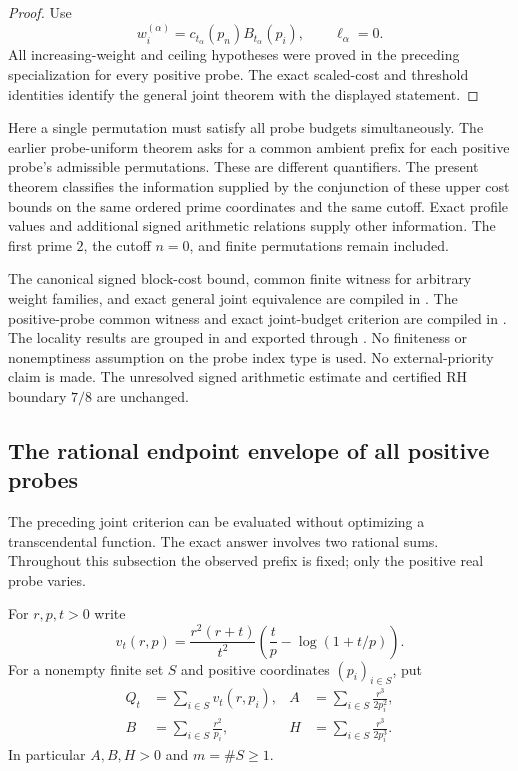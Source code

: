 \documentclass[11pt]{article}
\theoremstyle{definition}
\begin{document}
\begin{proof}
Use
\[
 w_i^{(\alpha)}
    =c_{t_\alpha}(p_n)B_{t_\alpha}(p_i),
       \qquad \ell_\alpha=0.
\]
All increasing-weight and ceiling hypotheses were proved in the
preceding specialization for every positive probe. The exact
scaled-cost and threshold identities identify the general
joint theorem with the displayed statement.
\end{proof}

Here a single permutation must satisfy all probe budgets
simultaneously. The earlier probe-uniform theorem asks for a
common ambient prefix for each positive probe's admissible
permutations. These are different quantifiers.
The present theorem classifies the information supplied by
the conjunction of these upper cost bounds on the same
ordered prime coordinates and the same cutoff. Exact profile
values and additional signed arithmetic relations supply
other information. The first prime $2$, the cutoff $n=0$,
and finite permutations remain included.

\begin{flushleft}
The canonical signed block-cost bound, common finite witness
for arbitrary weight families, and exact general joint
equivalence are compiled in
.
The positive-probe common witness and exact joint-budget
criterion are compiled in
.
The locality results are grouped in
 and exported through
.
No finiteness or nonemptiness assumption on the probe index
type is used. No external-priority claim is made.
The unresolved signed arithmetic estimate and certified RH
boundary $7/8$ are unchanged.
\end{flushleft}


\clearpage
\subsection{The rational endpoint envelope of all positive probes}

The preceding joint criterion can be evaluated without optimizing a
transcendental function. The exact answer involves two rational sums.
Throughout this subsection the observed prefix is fixed; only the
positive real probe varies.

For $r,p,t>0$ write
\[
 v_t(r,p)=\frac{r^2(r+t)}{t^2}
       \left(\frac tp-\log(1+t/p)\right).
\]
For a nonempty finite set $S$ and positive coordinates $(p_i)_{i\in S}$,
put
\[
 \begin{aligned}
 Q_t&=\sum_{i\in S}v_t(r,p_i),&
 A&=\sum_{i\in S}\frac{r^3}{2p_i^2},\\
 B&=\sum_{i\in S}\frac{r^2}{p_i},&
 H&=\sum_{i\in S}\frac{r^3}{2p_i^3}.
 \end{aligned}
\]
In particular $A,B,H>0$ and $m=\#S\ge1$.
\end{document}
